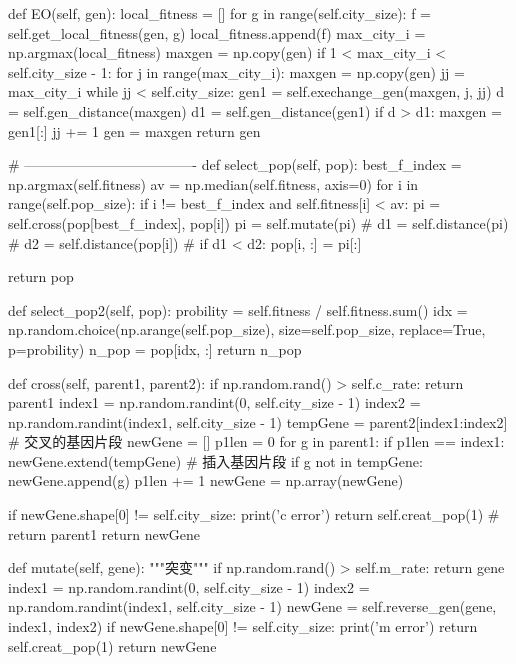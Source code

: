 \documentclass{ctexart}
\begin{document}
\begin{python}
    def EO(self, gen):
        local_fitness = []
        for g in range(self.city_size):
            f = self.get_local_fitness(gen, g)
            local_fitness.append(f)
        max_city_i = np.argmax(local_fitness)
        maxgen = np.copy(gen)
        if 1 < max_city_i < self.city_size - 1:
            for j in range(max_city_i):
                maxgen = np.copy(gen)
                jj = max_city_i
                while jj < self.city_size:
                    gen1 = self.exechange_gen(maxgen, j, jj)
                    d = self.gen_distance(maxgen)
                    d1 = self.gen_distance(gen1)
                    if d > d1:
                        maxgen = gen1[:]
                    jj += 1
        gen = maxgen
        return gen

    # -------------------------------------
    def select_pop(self, pop):
        best_f_index = np.argmax(self.fitness)
        av = np.median(self.fitness, axis=0)
        for i in range(self.pop_size):
            if i != best_f_index and self.fitness[i] < av:
                pi = self.cross(pop[best_f_index], pop[i])
                pi = self.mutate(pi)
                # d1 = self.distance(pi)
                # d2 = self.distance(pop[i])
                # if d1 < d2:
                pop[i, :] = pi[:]

        return pop

    def select_pop2(self, pop):
        probility = self.fitness / self.fitness.sum()
        idx = np.random.choice(np.arange(self.pop_size), size=self.pop_size, replace=True, p=probility)
        n_pop = pop[idx, :]
        return n_pop

    def cross(self, parent1, parent2):
        if np.random.rand() > self.c_rate:
            return parent1
        index1 = np.random.randint(0, self.city_size - 1)
        index2 = np.random.randint(index1, self.city_size - 1)
        tempGene = parent2[index1:index2]  # 交叉的基因片段
        newGene = []
        p1len = 0
        for g in parent1:
            if p1len == index1:
                newGene.extend(tempGene)  # 插入基因片段
            if g not in tempGene:
                newGene.append(g)
            p1len += 1
        newGene = np.array(newGene)

        if newGene.shape[0] != self.city_size:
            print('c error')
            return self.creat_pop(1)
            # return parent1
        return newGene

    def mutate(self, gene):
        """突变"""
        if np.random.rand() > self.m_rate:
            return gene
        index1 = np.random.randint(0, self.city_size - 1)
        index2 = np.random.randint(index1, self.city_size - 1)
        newGene = self.reverse_gen(gene, index1, index2)
        if newGene.shape[0] != self.city_size:
            print('m error')
            return self.creat_pop(1)
        return newGene


\end{python}
\end{document}
